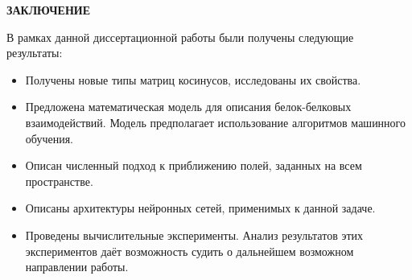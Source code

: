 \newpage
\begin{center}
	\textbf{\large ЗАКЛЮЧЕНИЕ}
\end{center}

В рамках данной диссертационной работы были получены следующие результаты:
\begin{itemize}
\item Получены новые типы матриц косинусов, исследованы их свойства.
\item Предложена математическая модель для описания белок-белковых взаимодействий. Модель предполагает использование алгоритмов машинного обучения.
\item Описан численный подход к приближению полей, заданных на всем пространстве.
\item Описаны архитектуры нейронных сетей, применимых к данной задаче.
\item Проведены вычислительные эксперименты. Анализ результатов этих экспериментов даёт возможность судить о дальнейшем возможном направлении работы.
\end{itemize}
